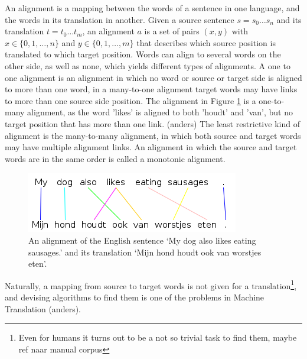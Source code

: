 \documentclass{report}
\theoremstyle{indented}
\begin{document}
An alignment is a mapping between the words of a sentence in one language, and the words in its translation in another. Given a source sentence $s = s_0 \ldots s_n$ and its translation $t = t_0 \ldots t_m$, an alignment $a$ is a set of pairs $(x,y)$ with $x\in \{0,1,\ldots,n\}$ and $y\in \{0,1,\ldots,m\}$ that describes which source position is translated to which target position. Words can align to several words on the other side, as well as none, which yields different types of alignments. A one to one alignment is an alignment in which no word or source or target side is aligned to more than one word, in a many-to-one alignment target words may have links to more than one source side position. The alignment in Figure \ref{fig:alignment} is a one-to-many alignment, as the word 'likes' is aligned to both 'houdt' and 'van', but no target position that has more than one link. (anders) The least restrictive kind of alignment is the many-to-many alignment, in which both source and target words may have multiple alignment links. An alignment in which the source and target words are in the same order is called a monotonic alignment.

\begin{figure}[!ht]
\centering
\includegraphics[scale=0.6]{alignment.png}
\caption{An alignment of the English sentence `My dog also likes eating sausages.' and its translation `Mijn hond houdt ook van worstjes eten'.%
}\label{fig:alignment}
\end{figure}

Naturally, a mapping from source to target words is not given for a translation\footnote{Even for humans it turns out to be a not so trivial task to find them, maybe ref naar manual corpus}, and devising algorithms to find them is one of the problems in Machine Translation (anders).
\end{document}

